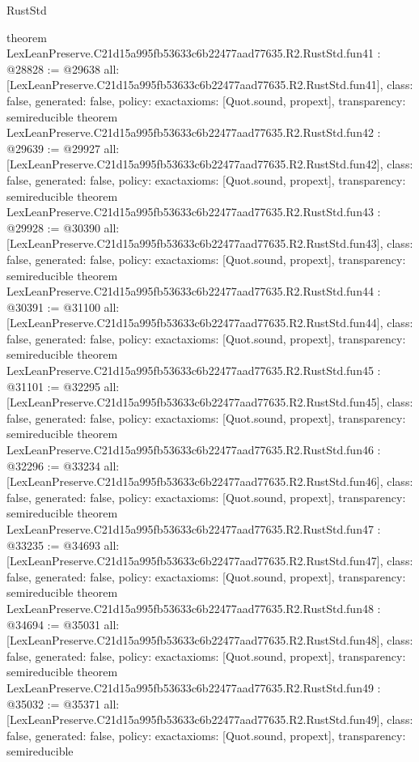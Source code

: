\begin{lexlean}{RustStd}
\begin{coremodule}
{}
theorem LexLeanPreserve.C21d15a995fb53633c6b22477aad77635.R2.RustStd.fun41 : @28828 := @29638 {
  all: [LexLeanPreserve.C21d15a995fb53633c6b22477aad77635.R2.RustStd.fun41],
  class: false,
  generated: false,
  policy: exact{axioms: [Quot.sound, propext]},
  transparency: semireducible
}
theorem LexLeanPreserve.C21d15a995fb53633c6b22477aad77635.R2.RustStd.fun42 : @29639 := @29927 {
  all: [LexLeanPreserve.C21d15a995fb53633c6b22477aad77635.R2.RustStd.fun42],
  class: false,
  generated: false,
  policy: exact{axioms: [Quot.sound, propext]},
  transparency: semireducible
}
theorem LexLeanPreserve.C21d15a995fb53633c6b22477aad77635.R2.RustStd.fun43 : @29928 := @30390 {
  all: [LexLeanPreserve.C21d15a995fb53633c6b22477aad77635.R2.RustStd.fun43],
  class: false,
  generated: false,
  policy: exact{axioms: [Quot.sound, propext]},
  transparency: semireducible
}
theorem LexLeanPreserve.C21d15a995fb53633c6b22477aad77635.R2.RustStd.fun44 : @30391 := @31100 {
  all: [LexLeanPreserve.C21d15a995fb53633c6b22477aad77635.R2.RustStd.fun44],
  class: false,
  generated: false,
  policy: exact{axioms: [Quot.sound, propext]},
  transparency: semireducible
}
theorem LexLeanPreserve.C21d15a995fb53633c6b22477aad77635.R2.RustStd.fun45 : @31101 := @32295 {
  all: [LexLeanPreserve.C21d15a995fb53633c6b22477aad77635.R2.RustStd.fun45],
  class: false,
  generated: false,
  policy: exact{axioms: [Quot.sound, propext]},
  transparency: semireducible
}
theorem LexLeanPreserve.C21d15a995fb53633c6b22477aad77635.R2.RustStd.fun46 : @32296 := @33234 {
  all: [LexLeanPreserve.C21d15a995fb53633c6b22477aad77635.R2.RustStd.fun46],
  class: false,
  generated: false,
  policy: exact{axioms: [Quot.sound, propext]},
  transparency: semireducible
}
theorem LexLeanPreserve.C21d15a995fb53633c6b22477aad77635.R2.RustStd.fun47 : @33235 := @34693 {
  all: [LexLeanPreserve.C21d15a995fb53633c6b22477aad77635.R2.RustStd.fun47],
  class: false,
  generated: false,
  policy: exact{axioms: [Quot.sound, propext]},
  transparency: semireducible
}
theorem LexLeanPreserve.C21d15a995fb53633c6b22477aad77635.R2.RustStd.fun48 : @34694 := @35031 {
  all: [LexLeanPreserve.C21d15a995fb53633c6b22477aad77635.R2.RustStd.fun48],
  class: false,
  generated: false,
  policy: exact{axioms: [Quot.sound, propext]},
  transparency: semireducible
}
theorem LexLeanPreserve.C21d15a995fb53633c6b22477aad77635.R2.RustStd.fun49 : @35032 := @35371 {
  all: [LexLeanPreserve.C21d15a995fb53633c6b22477aad77635.R2.RustStd.fun49],
  class: false,
  generated: false,
  policy: exact{axioms: [Quot.sound, propext]},
  transparency: semireducible
}
\end{coremodule}
\end{lexlean}
